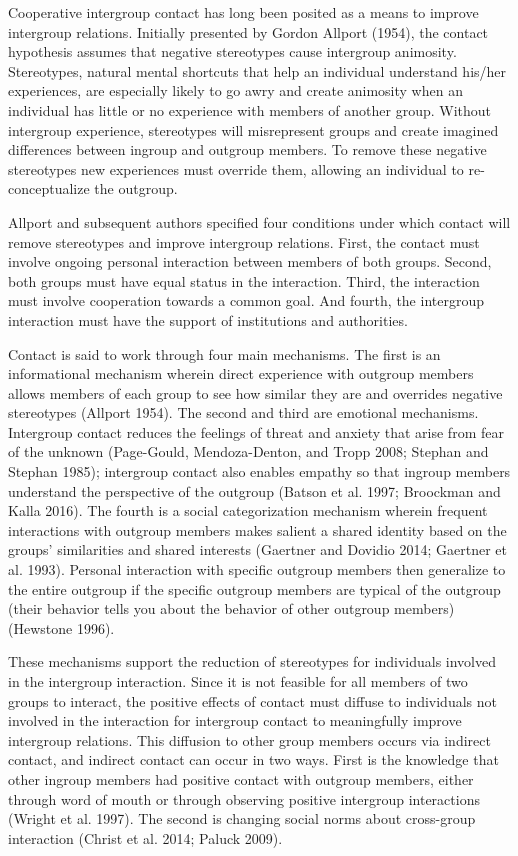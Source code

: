 \documentclass[11pt]{article}
\begin{document}
Cooperative intergroup contact has long been posited as a means to
improve intergroup relations. Initially presented by Gordon Allport
(1954), the contact hypothesis assumes that negative stereotypes cause
intergroup animosity. Stereotypes, natural mental shortcuts that help an
individual understand his/her experiences, are especially likely to go
awry and create animosity when an individual has little or no experience
with members of another group. Without intergroup experience,
stereotypes will misrepresent groups and create imagined differences
between ingroup and outgroup members. To remove these negative
stereotypes new experiences must override them, allowing an individual
to re-conceptualize the outgroup.

Allport and subsequent authors specified four conditions under which
contact will remove stereotypes and improve intergroup relations. First,
the contact must involve ongoing personal interaction between members of
both groups. Second, both groups must have equal status in the
interaction. Third, the interaction must involve cooperation towards a
common goal. And fourth, the intergroup interaction must have the
support of institutions and authorities.

Contact is said to work through four main mechanisms. The first is an
informational mechanism wherein direct experience with outgroup members
allows members of each group to see how similar they are and overrides
negative stereotypes (Allport 1954). The second and third are emotional
mechanisms. Intergroup contact reduces the feelings of threat and
anxiety that arise from fear of the unknown (Page-Gould, Mendoza-Denton,
and Tropp 2008; Stephan and Stephan 1985); intergroup contact also
enables empathy so that ingroup members understand the perspective of
the outgroup (Batson et al. 1997; Broockman and Kalla 2016). The fourth
is a social categorization mechanism wherein frequent interactions with
outgroup members makes salient a shared identity based on the groups'
similarities and shared interests (Gaertner and Dovidio 2014; Gaertner
et al. 1993). Personal interaction with specific outgroup members then
generalize to the entire outgroup if the specific outgroup members are
typical of the outgroup (their behavior tells you about the behavior of
other outgroup members) (Hewstone 1996).

These mechanisms support the reduction of stereotypes for individuals
involved in the intergroup interaction. Since it is not feasible for all
members of two groups to interact, the positive effects of contact must
diffuse to individuals not involved in the interaction for intergroup
contact to meaningfully improve intergroup relations. This diffusion to
other group members occurs via indirect contact, and indirect contact
can occur in two ways. First is the knowledge that other ingroup members
had positive contact with outgroup members, either through word of mouth
or through observing positive intergroup interactions (Wright et al.
1997). The second is changing social norms about cross-group interaction
(Christ et al. 2014; Paluck 2009).
\end{document}
